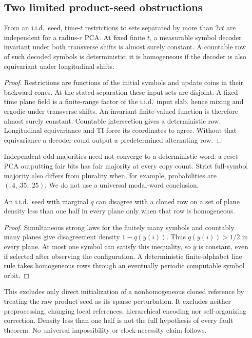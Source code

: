 \subsection{Two limited product-seed obstructions}
\begin{proposition}
\label{prop:product}
From an i.i.d.\ seed, time-$t$ restrictions to sets separated by
more than $2rt$ are independent for a radius-$r$ PCA. At fixed
finite $t$, a measurable symbol decoder invariant under both
transverse shifts is almost surely constant. A countable row of
such decoded symbols is deterministic; it is homogeneous if the
decoder is also equivariant under longitudinal shifts.
\end{proposition}
\begin{proof}
Restrictions are functions of the initial symbols and update
coins in their backward cones. At the stated separation these
input sets are disjoint. A fixed-time plane field is a finite-range
factor of the i.i.d.\ input slab, hence mixing and ergodic under
transverse shifts. An invariant finite-valued function is
therefore almost surely constant. Countable intersection gives
a deterministic row. Longitudinal equivariance and TI force its
coordinates to agree. Without that equivariance a decoder could
output a predetermined alternating row.
\end{proof}

Independent odd majorities need not converge to a deterministic
word: a reset PCA outputting fair bits has fair majority at every
copy count. Strict full-symbol majority also differs from
plurality when, for example, probabilities are $(.4,.35,.25)$.
We do not use a universal modal-word conclusion.

\begin{proposition}
\label{prop:basin}
An i.i.d.\ seed with marginal $q$ can disagree with a cloned row
on a set of plane density less than one half in every plane
only when that row is homogeneous.
\end{proposition}
\begin{proof}
Simultaneous strong laws for the finitely many symbols and
countably many planes give disagreement density $1-q(y(i))$.
Thus $q(y(i))>1/2$ in every plane. At most one symbol can satisfy
this inequality, so $y$ is constant, even if selected after
observing the configuration. A deterministic finite-alphabet
line rule takes homogeneous rows through an eventually periodic
computable symbol orbit.
\end{proof}
This excludes only direct initialization of a nonhomogeneous
cloned reference by treating the raw product seed as its sparse
perturbation. It excludes neither preprocessing, changing local
references, hierarchical encoding nor self-organizing correction.
Density less than one half is not the full hypothesis of every
fault theorem. No universal impossibility or clock-necessity
claim follows.

